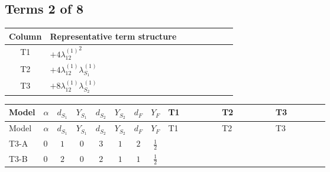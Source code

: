 \documentclass[8pt]{article}
\begin{document}
\begin{landscape}
\subsection*{Terms 2 of 8}
\begin{center}
\begin{tabular}{@{}c >{\raggedright\arraybackslash}p{0.82\linewidth}@{}}
\toprule
Column & Representative term structure \\
\midrule
T1 & \(\displaystyle +4 {\lambda_{12}^{(1)}}^2\) \\
\midrule
T2 & \(\displaystyle +4 {\lambda_{12}^{(1)}} {\lambda_{S_1}^{(1)}}\) \\
\midrule
T3 & \(\displaystyle +8 {\lambda_{12}^{(1)}} {\lambda_{S_2}^{(1)}}\) \\
\midrule
\bottomrule
\end{tabular}
\end{center}
\smallskip
\tiny
\begin{longtable}{@{}llcccccc >{\raggedright\arraybackslash}p{0.21\linewidth} >{\raggedright\arraybackslash}p{0.21\linewidth} >{\raggedright\arraybackslash}p{0.21\linewidth}@{}}
\toprule
Model & $\alpha$ & $d_{S_1}$ & $Y_{S_1}$ & $d_{S_2}$ & $Y_{S_2}$ & $d_F$ & $Y_F$ & T1 & T2 & T3 \\
\midrule
\endfirsthead
\toprule
Model & $\alpha$ & $d_{S_1}$ & $Y_{S_1}$ & $d_{S_2}$ & $Y_{S_2}$ & $d_F$ & $Y_F$ & T1 & T2 & T3 \\
\midrule
\endhead
T3-A & $0$ & $1$ & $0$ & $3$ & $1$ & $2$ & $\frac{1}{2}$ & \scriptsize\adjustbox{max width=\linewidth}{$\begin{gathered} +4 {\lambda_{12}^{(1)}}^2\end{gathered}$} & \scriptsize\adjustbox{max width=\linewidth}{$\begin{gathered} +4 {\lambda_{12}^{(1)}} {\lambda_{S_1}^{(1)}}\end{gathered}$} & \scriptsize\adjustbox{max width=\linewidth}{$\begin{gathered} +8 {\lambda_{12}^{(1)}} {\lambda_{S_2}^{(1)}}\end{gathered}$} \\
\midrule
T3-B & $0$ & $2$ & $0$ & $2$ & $1$ & $1$ & $\frac{1}{2}$ & \scriptsize\adjustbox{max width=\linewidth}{$\begin{gathered} +4 {\lambda_{12}^{(1)}}^2\end{gathered}$} & \scriptsize\adjustbox{max width=\linewidth}{$\begin{gathered} +6 {\lambda_{12}^{(1)}} {\lambda_{S_1}^{(1)}}\end{gathered}$} & \scriptsize\adjustbox{max width=\linewidth}{$\begin{gathered} +6 {\lambda_{12}^{(1)}} {\lambda_{S_2}^{(1)}}\end{gathered}$} \\

\end{longtable}
\end{landscape}
\end{document}
